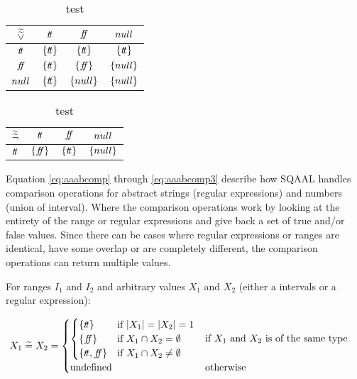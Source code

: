 \begin{table}[H]
    \centering
    \caption{test}
    \begin{tabular}{c|ccc}
        $\widetilde{\widetilde{\lor}}$ & $t\!t$ & $f\!\!f$ & $null$ \\
        \hline
        $t\!t$ & $\{t\!t\}$ & $\{t\!t\}$ & $\{t\!t\}$ \\
        $f\!\!f$ & $\{t\!t\}$ & $\{f\!\!f\}$ & $\{null\}$ \\
        $null$ & $\{t\!t\}$ & $\{null\}$ & $\{null\}$ \\
    \end{tabular}
    \label{tab:aaablor}
\end{table}

\begin{table}[H]
    \centering
    \caption{test}
    \begin{tabular}{c|ccc}
        $\widetilde{\widetilde{\neg}}$ & $t\!t$ & $f\!\!f$ & $null$ \\
        \hline
        $t\!t$ & $\{f\!\!f\}$ & $\{t\!t\}$ & $\{null\}$ \\
    \end{tabular}
    \label{tab:aaabneg}
\end{table}

Equation \ref{eq:aaabcomp} through \ref{eq:aaabcomp3} describe how SQAAL handles comparison operations for abstract strings (regular expressions) and numbers (union of interval).
Where the comparison operations work by looking at the entirety of the range or regular expressions and give back a set of true and/or false values.
Since there can be cases where regular expressions or ranges are identical, have some overlap or are completely different, the comparison operations can return multiple values.


For ranges $I_1$ and $I_2$ and arbitrary values $X_1$ and $X_2$ (either a intervals or a regular expression):

\begin{align} \label{eq:aaabcomp}
    X_1 \;\aab{=}\; X_2 &= \begin{cases}
        \begin{cases}
        \{\true\} & \text{if } |X_1| = |X_2| = 1 \\
        \{\false\} & \text{if } X_1 \cap X_2 = \emptyset \\
        \{\true, \false\} & \text{if } X_1 \cap X_2 \neq \emptyset
        \end{cases} & \text{if $X_1$ and $X_2$ is of the same type} \\
        \text{undefined} & \text{otherwise}
    \end{cases}
\end{align}

